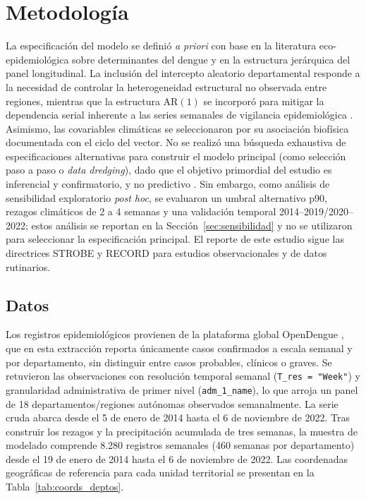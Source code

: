 \documentclass[11pt,a4paper]{article}
\begin{document}
\section{Metodología}

La especificación del modelo se definió \textit{a priori} con base en la literatura eco-epidemiológica sobre determinantes del dengue \parencite{mordecai2019thermal, anyamba2019global} y en la estructura jerárquica del panel longitudinal. La inclusión del intercepto aleatorio departamental responde a la necesidad de controlar la heterogeneidad estructural no observada entre regiones, mientras que la estructura $\text{AR}(1)$ se incorporó para mitigar la dependencia serial inherente a las series semanales de vigilancia epidemiológica \parencite{zuur2010protocol}. Asimismo, las covariables climáticas se seleccionaron por su asociación biofísica documentada con el ciclo del vector. No se realizó una búsqueda exhaustiva de especificaciones alternativas para construir el modelo principal (como selección paso a paso o \textit{data dredging}), dado que el objetivo primordial del estudio es inferencial y confirmatorio, y no predictivo \parencite{shmueli2010explain}. Sin embargo, como análisis de sensibilidad exploratorio \textit{post hoc}, se evaluaron un umbral alternativo p90, rezagos climáticos de 2 a 4 semanas y una validación temporal 2014--2019/2020--2022; estos análisis se reportan en la Sección~\ref{sec:sensibilidad} y no se utilizaron para seleccionar la especificación principal. El reporte de este estudio sigue las directrices STROBE \parencite{vonelm2007strobe} y RECORD \parencite{benchimol2015record} para estudios observacionales y de datos rutinarios.

\subsection{Datos}

Los registros epidemiológicos provienen de la plataforma global OpenDengue \parencite{clarke2025opendengue}, que en esta extracción reporta únicamente casos confirmados a escala semanal y por departamento, sin distinguir entre casos probables, clínicos o graves. Se retuvieron las observaciones con resolución temporal semanal (\texttt{T\_res = "Week"}) y granularidad administrativa de primer nivel (\texttt{adm\_1\_name}), lo que arroja un panel de 18 departamentos/regiones autónomas observados semanalmente. La serie cruda abarca desde el 5 de enero de 2014 hasta el 6 de noviembre de 2022. Tras construir los rezagos y la precipitación acumulada de tres semanas, la muestra de modelado comprende 8.280 registros semanales (460 semanas por departamento) desde el 19 de enero de 2014 hasta el 6 de noviembre de 2022. Las coordenadas geográficas de referencia para cada unidad territorial se presentan en la Tabla~\ref{tab:coords_deptos}.
\end{document}
